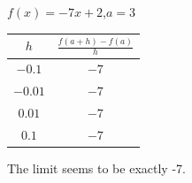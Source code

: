 {$f(x) = -7x+2$,\quad  $a=3$}
{\begin{tabular}{cc}
$h$ & $\frac{f(a+h)-f(a)}{h}$\\ \hline 
 $-0.1$ & $-7$ \\
 $-0.01$ & $-7$ \\
 $0.01$ & $-7$ \\
 $0.1$ & $-7$
\end{tabular}

The limit seems to be exactly -7.
}

